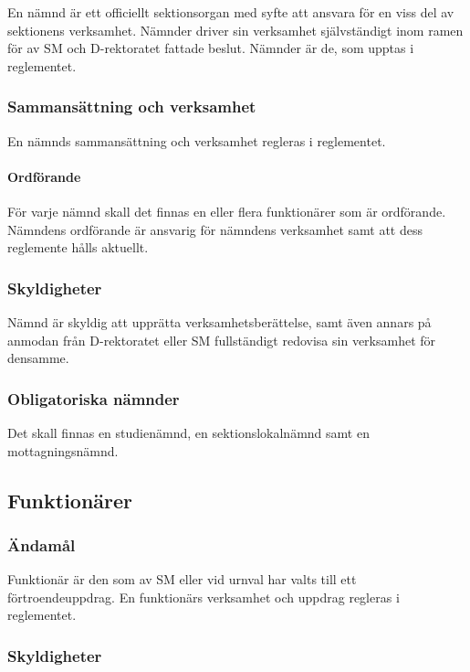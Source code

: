 \documentclass[a4paper,12pt]{article}
\begin{document}
En nämnd är ett officiellt sektionsorgan med syfte att ansvara för en viss del av sektionens verksamhet. Nämnder driver sin verksamhet självständigt inom ramen för av SM och D-rektoratet fattade beslut. Nämnder är de, som upptas i reglementet.

\subsubsection{Sammansättning och verksamhet}

En nämnds sammansättning och verksamhet regleras i reglementet.

\paragraph{Ordförande}

För varje nämnd skall det finnas en eller flera funktionärer som är ordförande. Nämndens ordförande är ansvarig för nämndens verksamhet samt att dess reglemente hålls aktuellt.

\subsubsection{Skyldigheter}

Nämnd är skyldig att upprätta verksamhetsberättelse, samt även annars på anmodan från D-rektoratet eller SM fullständigt redovisa sin verksamhet för densamme.

\subsubsection{Obligatoriska nämnder}

Det skall finnas en studienämnd, en sektionslokalnämnd samt en mottagningsnämnd.

\subsection{Funktionärer}

\subsubsection{Ändamål}

Funktionär är den som av SM eller vid urnval har valts till ett förtroendeuppdrag. En funktionärs verksamhet och uppdrag regleras i reglementet.

\subsubsection{Skyldigheter}
\end{document}
